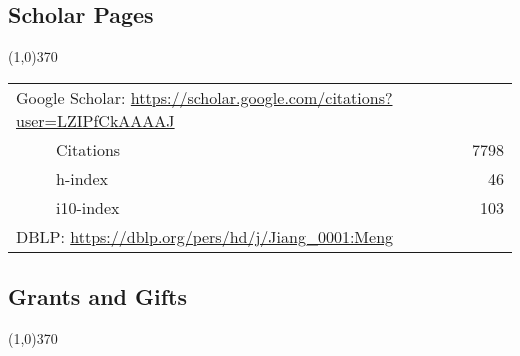 \documentclass[10pt]{article}
\begin{document}
\subsection{\sc Scholar Pages}
\vspace{-0.4cm} \line(1,0){370} \vspace{-0.1cm}

\begin{table}[h!]
\begin{tabular*}{12.7cm}{p{11.65cm}r}
\multicolumn{2}{l}{Google Scholar: \url{https://scholar.google.com/citations?user=LZIPfCkAAAAJ}} \\
~~~~~Citations & 7798 \\
~~~~~h-index & 46 \\
~~~~~i10-index & 103 \\
\multicolumn{2}{l}{DBLP: \url{https://dblp.org/pers/hd/j/Jiang\_0001:Meng}} \\
\end{tabular*}
\end{table}

\subsection{\sc Grants and Gifts}
\vspace{-0.4cm} \line(1,0){370} \vspace{-0.1cm}
\end{document}

